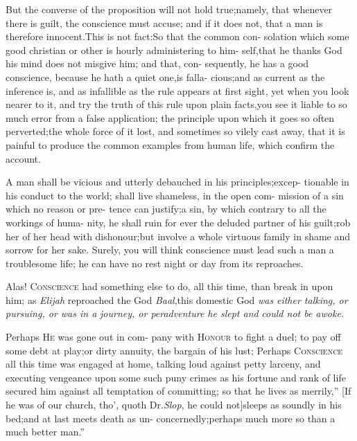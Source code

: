 \documentclass{article}
\begin{document}
\lqq But the converse of the proposition\break
\lqq will not hold true;\tsh namely, that\break
\lqq whenever there is guilt, the conscience\break
\lqq must accuse; and if it does not, that\break
\lqq a man is therefore innocent.\tsk This is\break
\lqq not fact:\tsk So that the common con-\break
\lqq solation which some good christian or\break
\lqq other is hourly administering to him-\break
\lqq self,\tsk that he thanks God his mind\break
\lqq does not misgive him; and that, con-
\lqq sequently, he has a good conscience,\break
\lqq because he hath a quiet one,\tsk is falla-\break
\lqq cious;\tsk and as current as the inference\break
\lqq is, and as infallible as the rule appears\break
\lqq at first sight, yet when you look nearer\break
\lqq to it, and try the truth of this rule\break
\lqq upon plain facts,\tsk you see it liable to\break
\lqq so much error from a false application;\break
\lqq \tsk the principle upon which it goes so\break
\lqq often perverted;\tsk the whole force of\break
\lqq it lost, and sometimes so vilely cast\break
\lqq away, that it is painful to produce the\break
\lqq common examples from human life,\break
\lqq which confirm the account.

\lqq A man shall be vicious and utterly\break
\lqq debauched in his principles;\tsk excep-\break
\lqq tionable in his conduct to the world;\break
\lqq shall live shameless, in the open com-\break
\lqq mission of a sin which no reason or pre-\break
\lqq tence can justify;\tsk a sin, by which
\lqq contrary to all the workings of huma-\break
\lqq nity, he shall ruin for ever the deluded\break
\lqq partner of his guilt;\tsk rob her of her\break
{}\break
\lqq head with dishonour;\tsk but involve a\break
\lqq whole virtuous family in shame and\break
\lqq sorrow for her sake. Surely, you will\break
\lqq think conscience must lead such a man\break
\lqq a troublesome life; he can have no\break
\lqq rest night or day from its reproaches.

\lqq Alas! \textsc{Conscience} had something\break
\lqq else to do, all this time, than break in\break
\lqq upon him; as \textit{Elijah} reproached the\break
\lqq God \textit{Baal},\tsh this domestic God \textit{was}\break
\lqq \textit{either talking, or pursuing, or was in a}\break
\lqq \textit{journey, or peradventure he slept and}\break
\lqq \textit{could not be awoke.}

\lqq Perhaps \textsc{He} was gone out in com-\break
\lqq pany with \textsc{Honour} to fight a duel;
\lqq to pay off some debt at play;\tsh or\break
\lqq dirty annuity, the bargain of his lust;\break
\lqq Perhaps \textsc{Conscience} all this time was\break
\lqq engaged at home, talking loud against\break
\lqq petty larceny, and executing vengeance\break
\lqq upon some such puny crimes as his\break
\lqq fortune and rank of life secured him\break
\lqq against all temptation of committing;\break
\lqq so that he lives as merrily,” [If he was\break
of our church, tho’, quoth Dr.\@ \textit{Slop}, he\break
could not]\tsk \lqq sleeps as soundly in his\break
\lqq bed;\tsk and at last meets death as un-\break
\lqq concernedly;\tsk perhaps much more so\break
\lqq than a much better man.”
\end{document}
